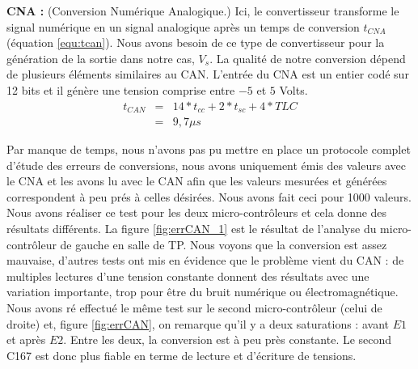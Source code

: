 \hspace{3mm} \textbf{CNA :} (Conversion Numérique Analogique.) Ici, le convertisseur transforme le signal numérique en un signal analogique après un temps de conversion $t_{CNA}$ (équation \ref{equ:tcan}). Nous avons besoin de ce type de convertisseur pour la génération de la sortie dans notre cas, $V_{s}$. La qualité de notre conversion dépend de plusieurs éléments similaires au CAN. L'entrée du CNA est un entier codé sur 12 bits et il génère une tension comprise entre $-5$ et $5$ Volts. 
\begin{eqnarray}
\label{equ:tcan}
t_{CAN} &=& 14*t_{cc} + 2*t_{sc} + 4*TLC \\
&=&  9,7 \mu s%
\end{eqnarray}

Par manque de temps, nous n'avons pas pu mettre en place un protocole complet d'étude des erreurs de conversions, nous avons uniquement émis des valeurs avec le CNA et les avons lu avec le CAN afin que les valeurs mesurées et générées correspondent à peu prés à celles désirées. Nous avons fait ceci pour 1000 valeurs. Nous avons réaliser ce test pour les deux micro-contrôleurs et cela donne des résultats différents. La figure \ref{fig:errCAN_1} est le résultat de l'analyse du micro-contrôleur de gauche en salle de TP. Nous voyons que la conversion est assez mauvaise, d'autres tests ont mis en évidence que le problème vient du CAN : de multiples lectures d'une tension constante donnent des résultats avec une variation importante, trop pour être du bruit numérique ou électromagnétique. Nous avons ré effectué le même test sur le second micro-contrôleur (celui de droite) et, figure \ref{fig:errCAN}, on remarque qu'il y a deux saturations : avant $E1$ et après $E2$. Entre les deux, la conversion est à peu près constante. Le second C167 est donc plus fiable en terme de lecture et d'écriture de tensions.


